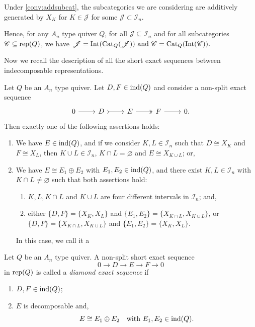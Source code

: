 	Under \cref{conv:addsubcat}, the subcategories we are considering are additively generated by $X_K$ for $K \in \mathscr{J}$ for some  $\mathscr{J} \subset \mathcal{I}_n$.
	
	Hence, for any $A_n$ type quiver $Q$, for all $\mathscr{J} \subseteq \mathcal{I}_n$ and for all subcategories $\mathscr{C} \subseteq \operatorname{rep}(Q)$, we have $\mathscr{J} = \operatorname{Int}(\operatorname{Cat}_Q(\mathscr{J})) \text{ and } \mathscr{C} = \operatorname{Cat}_Q(\operatorname{Int}(\mathscr{C})).$

    Now we recall the description of all the short exact sequences between indecomposable representations.

    \begin{theorem} \label{thm:exttypeA} Let $Q$ be an $A_n$ type quiver. Let $D,F \in \operatorname{ind}(Q)$ and consider a non-split exact sequence \[\begin{tikzcd}
	0 & D & E & F &  0.
	\arrow[from=1-1, to=1-2]
	\arrow[tail, from=1-2, to=1-3]
	\arrow[two heads,from=1-3, to=1-4]
	\arrow[from=1-4, to=1-5]
\end{tikzcd} \]
      Then exactly one of the following assertions holds:
      \begin{enumerate}[label=$(\alph*)$,itemsep=1mm]
          \item We have $E \in \operatorname{ind}(Q)$, and if we consider $K,L \in \mathcal{I}_n$ such that $D \cong X_K$ and $F \cong X_L$, then $K \cup L \in \mathcal{I}_n$, $K \cap L = \varnothing$ and $E \cong X_{K \cup L}$; or,
          \item We have $E \cong E_1 \oplus E_2$ with $E_1,E_2 \in \operatorname{ind}(Q)$, and there exist $K,L \in \mathcal{I}_n$ with $K \cap L \neq \varnothing$ such that both assertions hold:
          \begin{enumerate}[label=$\bullet$,itemsep=1mm]
          \item $K,L,K \cap L$ and $K \cup L$ are four different intervals in $\mathcal{I}_n$; and,
          \item either $\{D,F\} = \{X_K, X_L\}$ and $\{E_1,E_2\} = \{X_{K\cap L}, X_{K \cup L} \}$, or \\
          $\{D,F\} = \{X_{K \cap L}, X_{K \cup L}\}$ and $\{E_1,E_2\} = \{X_{K}, X_{L} \}$.
          \end{enumerate}
          In this case, we call it a  
      \end{enumerate}
    \end{theorem}

\begin{definition}
Let $Q$ be an $A_n$ type quiver. A non-split short exact sequence
\[
0 \longrightarrow D \longrightarrow E \longrightarrow F \longrightarrow 0
\]
in $\operatorname{rep}(Q)$ is called a \emph{diamond exact sequence} if
\begin{enumerate}[label=(\roman*), itemsep=1mm]
    \item $D,F \in \operatorname{ind}(Q)$;
    \item $E$ is decomposable and,
    \[
    E \cong E_1 \oplus E_2 \quad \text{with } E_1,E_2 \in \operatorname{ind}(Q).
    \]
\end{enumerate}
\end{definition}
    
